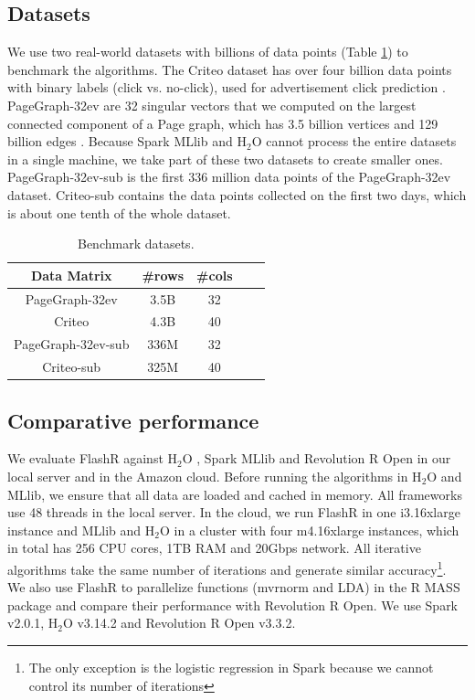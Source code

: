 \subsection{Datasets}\label{sec:data}
We use two real-world datasets with billions of data points (Table \ref{tbl:data})
to benchmark the algorithms. The Criteo dataset has over four billion data
points with binary labels (click vs. no-click), used for advertisement click
prediction \cite{criteo}. PageGraph-32ev are 32 singular vectors that we computed
on the largest connected component of a Page graph, which has 3.5 billion vertices and
129 billion edges \cite{webgraph}. Because Spark MLlib and H$_2$O cannot process
the entire datasets in a single machine, we take part of these two datasets
to create smaller ones.
PageGraph-32ev-sub is the first 336 million data points
of the PageGraph-32ev dataset. Criteo-sub contains the data points collected
on the first two days, which is about one tenth of the whole dataset.

\begin{table}
\begin{center}
\caption{Benchmark datasets.}
\vspace{-10pt}
\footnotesize
\begin{tabular}{|c|c|c|c|c|}
\hline
Data Matrix & \#rows & \#cols \\
\hline
PageGraph-32ev \cite{webgraph} & 3.5B & 32 \\
\hline
Criteo \cite{criteo} & 4.3B & 40 \\
\hline
PageGraph-32ev-sub \cite{webgraph} & 336M & 32 \\
\hline
Criteo-sub \cite{criteo} & 325M & 40 \\
\hline
\end{tabular}
\normalsize
\label{tbl:data}
\end{center}
\vspace{-10pt}
\end{table}

\subsection{Comparative performance}
We evaluate FlashR against H$_2$O \cite{h2o}, Spark MLlib \cite{mllib} and
Revolution R Open \cite{rro} in our local server and in the Amazon cloud.
Before running the algorithms in H$_2$O and MLlib, we ensure that all data are
loaded and cached in memory. All frameworks use 48 threads in the local server.
In the cloud, we run FlashR in one i3.16xlarge instance
and MLlib and H$_2$O in a cluster with four m4.16xlarge instances,
which in total has 256 CPU cores, 1TB RAM and 20Gbps network.
All iterative algorithms take the same number of iterations and generate
similar accuracy\footnote{The only exception is the logistic regression in Spark
because we cannot control its number of iterations}.
We also use FlashR to parallelize functions (mvrnorm and LDA)
in the R MASS package and compare their performance with Revolution R Open. We use
Spark v2.0.1, H$_2$O v3.14.2 and Revolution R Open v3.3.2.

